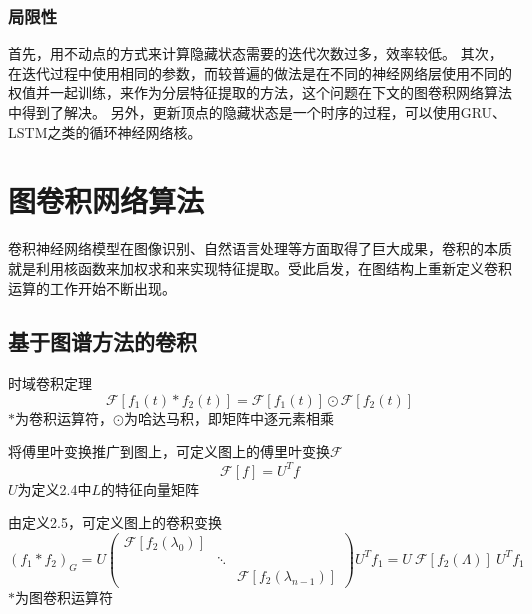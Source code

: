 \subsubsection{局限性}
首先，用不动点的方式来计算隐藏状态需要的迭代次数过多，效率较低。
其次，在迭代过程中使用相同的参数，而较普遍的做法是在不同的神经网络层使用不同的权值并一起训练，来作为分层特征提取的方法，这个问题在下文的图卷积网络算法中得到了解决。
另外，更新顶点的隐藏状态是一个时序的过程，可以使用GRU、LSTM之类的循环神经网络核。

\section{图卷积网络算法}
卷积神经网络模型在图像识别、自然语言处理等方面取得了巨大成果，卷积的本质就是利用核函数来加权求和来实现特征提取。受此启发，在图结构上重新定义卷积运算的工作开始不断出现。

\subsection{基于图谱方法的卷积}

\begin{theorem}
    时域卷积定理
    \begin{equation}
        \mathcal{F}\left[f_{1}(t) * f_{2}(t)\right]=\mathcal{F}\left[f_{1}(t)\right] \odot \mathcal{F}\left[f_{2}(t)\right]
    \end{equation}
    $*$为卷积运算符，$\odot$为哈达马积，即矩阵中逐元素相乘
\end{theorem}

\begin{definition}
    将傅里叶变换推广到图上，可定义图上的傅里叶变换$\mathcal{F}$
    \begin{equation}
        \mathcal{F}[f]=U^Tf
    \end{equation}
    $U$为定义2.4中$L$的特征向量矩阵
\end{definition}

\begin{definition}
    由定义2.5，可定义图上的卷积变换
    \begin{equation}
        (f_1*f_2)_G=U\left(\begin{array}{ccc}
            \mathcal{F}[f_2(\lambda_0)] & & \\
            & \ddots & \\
            & & \mathcal{F}[f_2(\lambda_{n-1})]
            \end{array}\right)U^Tf_1=U\ \mathcal{F}[f_2(\Lambda)]\ U^Tf_1
    \end{equation}
    $*$为图卷积运算符
\end{definition}

